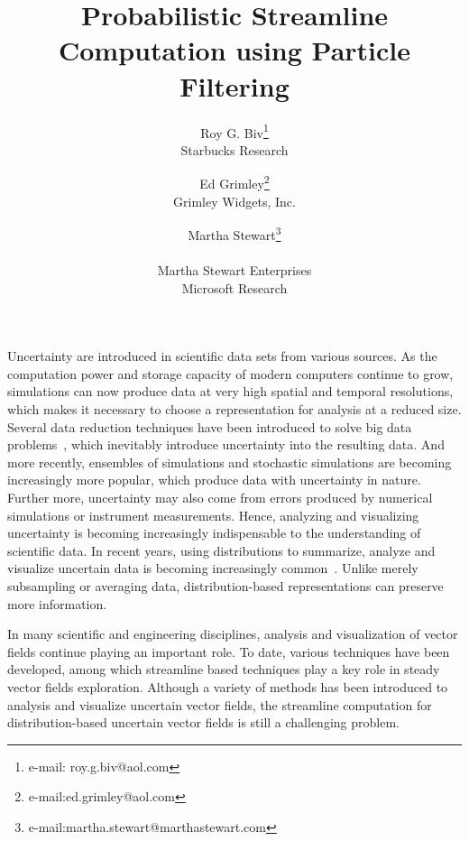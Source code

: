 \documentclass[review]{vgtc}                 %
\title{Probabilistic Streamline Computation using Particle Filtering}
\author{Roy G. Biv\thanks{e-mail: roy.g.biv@aol.com}\\ %
        \scriptsize Starbucks Research %
\and Ed Grimley\thanks{e-mail:ed.grimley@aol.com}\\ %
     \scriptsize Grimley Widgets, Inc. %
\and Martha Stewart\thanks{e-mail:martha.stewart@marthastewart.com}\\ %
     \parbox{1.4in}{\scriptsize \centering Martha Stewart Enterprises \\ Microsoft Research}}
\begin{document}


\maketitle

Uncertainty are introduced in scientific data sets from various sources. As the computation power and storage capacity of modern computers continue to grow, simulations can now produce data at very high spatial and temporal resolutions, which makes it necessary to choose a representation for analysis at a reduced size. Several data reduction techniques have been introduced to solve big data problems~\cite{DBLP:conf/ldav/ThompsonLBBGPP11, conf/ldav/LiuLBP12, 6378985}, which inevitably introduce uncertainty into the resulting data. And more recently, ensembles of simulations and stochastic simulations are becoming increasingly more popular, which produce data with uncertainty in nature. Further more, uncertainty may also come from errors produced by numerical simulations or instrument measurements. Hence, analyzing and visualizing uncertainty is becoming increasingly indispensable to the understanding of scientific data. In recent years, using distributions to summarize, analyze and visualize uncertain data is becoming increasingly common~\cite{DBLP:conf/ldav/ThompsonLBBGPP11, 6378985}. Unlike merely subsampling or averaging data, distribution-based representations can preserve more information.

In many scientific and engineering disciplines, analysis and visualization of vector fields continue playing an important role. To date, various techniques have been developed, among which streamline based techniques play a key role in steady vector fields exploration. Although a variety of methods has been introduced to analysis and visualize uncertain vector fields, the streamline computation for distribution-based uncertain vector fields is still a challenging problem.
\end{document}
